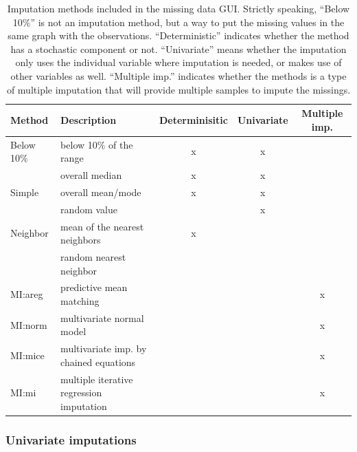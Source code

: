 \documentclass[article]{jss}
\begin{document}
\begin{center}
\begin{table}[h]
\begin{centering}
\begin{tabular}{l|l|c|c|c}
\hline 
\textbf{\scriptsize{Method}} & \textbf{\scriptsize{Description}} & \textbf{\scriptsize{Determinisitic}} & \textbf{\scriptsize{Univariate}} & \textbf{\scriptsize{Multiple imp.}}\tabularnewline
\hline 
{\scriptsize{Below 10\%}} & {\scriptsize{below 10\% of the range}} & {\scriptsize{x}} & {\scriptsize{x}} & \tabularnewline
\hline 
 & {\scriptsize{overall median}} & {\scriptsize{x}} & {\scriptsize{x}} & \tabularnewline
{\scriptsize{Simple}} & {\scriptsize{overall mean/mode}} & {\scriptsize{x}} & {\scriptsize{x}} & \tabularnewline 
 & {\scriptsize{random value}} &  & {\scriptsize{x}} & \tabularnewline
\hline
{\scriptsize{Neighbor}} & {\scriptsize{mean of the nearest neighbors}} & {\scriptsize{x}} &  & \tabularnewline
 & {\scriptsize{random nearest neighbor}} &  &  & \tabularnewline
\hline 
{\scriptsize{MI:areg}} & {\scriptsize{predictive mean matching}} &  &  & {\scriptsize{x}}\tabularnewline
\hline 
{\scriptsize{MI:norm}} & {\scriptsize{multivariate normal model}} &  &  & {\scriptsize{x}}\tabularnewline
\hline 
{\scriptsize{MI:mice}} & {\scriptsize{multivariate imp. by chained equations}} &  &  & {\scriptsize{x}}\tabularnewline
\hline 
{\scriptsize{MI:mi}} & {\scriptsize{multiple iterative regression imputation}} &  &  & {\scriptsize{x}}\tabularnewline
\hline 
\end{tabular}
\par\end{centering}
\caption{Imputation methods included in the missing data GUI. Strictly speaking, 
``Below 10\%'' is not an imputation method, but a way to put the missing 
values in the same graph with the observations. ``Deterministic''
indicates whether the method has a stochastic component or not. ``Univariate''
means whether the imputation only uses the individual variable where
imputation is needed, or makes use of other variables as well. ``Multiple
imp.'' indicates whether the methods is a type of multiple imputation that 
will provide multiple samples to impute the missings.}
\label{tab:compare-methods}
\end{table}
\par\end{center}


\subsubsection{Univariate imputations}
\end{document}
